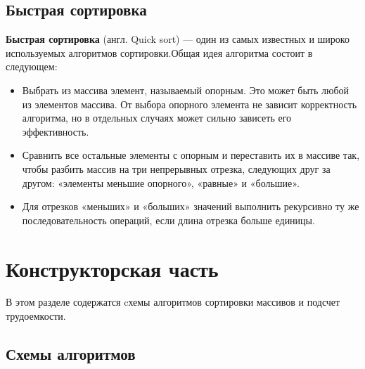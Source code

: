 \documentclass[a4paper,12pt]{report}
\begin{document}
\section{Быстрая сортировка}
\hspace{0.6cm} \textbf{Быстрая сортировка} (англ. Quick sort) — один из самых известных и широко используемых алгоритмов сортировки.Общая идея алгоритма состоит в следующем:
\begin{itemize}
\item Выбрать из массива элемент, называемый опорным. Это может быть любой из элементов массива. От выбора опорного элемента не зависит корректность алгоритма, но в отдельных случаях может сильно зависеть его эффективность.
\item Сравнить все остальные элементы с опорным и переставить их в массиве так, чтобы разбить массив на три непрерывных отрезка, следующих друг за другом: «элементы меньшие опорного», «равные» и «большие».
\item Для отрезков «меньших» и «больших» значений выполнить рекурсивно ту же последовательность операций, если длина отрезка больше единицы.
\end{itemize}

\chapter{Конструкторская часть}
\hspace{0.6cm}В этом разделе содержатся cхемы алгоритмов сортировки массивов и подсчет трудоемкости.
\newpage
\section{Схемы алгоритмов}
\end{document}
